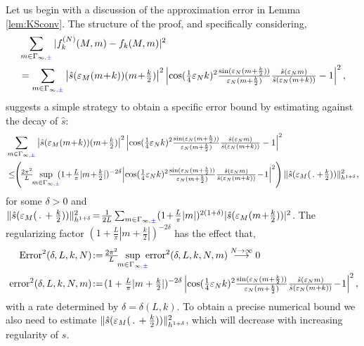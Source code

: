 \documentclass[a4paper, 11pt]{article}
\DeclareMathOperator{\1}{\mathds{1}}
\begin{document}
\bigskip

Let us begin with a discussion of the approximation error in Lemma \ref{lem:KSconv}. The structure of the proof, and specifically considering,
\begin{align}
\label{eq:uniformestimate}
& \sum_{m\in\Gamma_{\infty,{\color{blue}\pm}}}|f^{(N)}_{k}(M,m)-f_{k}(M,m)|^{2} \\ \nonumber
& = \sum_{m\in\Gamma_{\infty,{\color{blue}\pm}}}\left|\hat{s}(\varepsilon_{M}(m\!+\!k))(m\!+\!\tfrac{k}{2})\right|^{2}\left|\cos(\tfrac{1}{4}\varepsilon_{N}k)^{2}\tfrac{\sin(\varepsilon_{N}(m+\frac{k}{2}))}{\varepsilon_{N}(m+\frac{k}{2})}\tfrac{\hat{s}(\varepsilon_{N}m)}{\hat{s}(\varepsilon_{N}(m+k))}-1\right|^{2},
\end{align}
suggests a simple strategy to obtain a specific error bound by estimating against the decay of $\hat{s}$:
\begin{align}
\label{eq:sobolevtrade}
& \sum_{m\in\Gamma_{\infty,{\color{blue}\pm}}}\left|\hat{s}(\vep_{M}(m\!+\!k))(m\!+\!\tfrac{k}{2})\right|^{2}\left| \cos(\tfrac{1}{4}\vep_{N}k)^{2}\tfrac{\sin(\vep_{N}(m+\frac{k}{2}))}{\vep_{N}(m+\frac{k}{2})}\tfrac{\hat{s}(\vep_{N}m)}{\hat{s}(\vep_{N}(m+k))}-1\right|^{2} \\ \nonumber
& \leq\!\!\left(\!\tfrac{2\pi^{2}}{L}\!\!\sup_{m\in\Gamma_{\infty,{\color{blue}\pm}}}\!\!(1\!+\!\tfrac{L}{\pi}|m\!+\!\tfrac{k}{2}|)^{-2\delta}\!\left| \cos(\tfrac{1}{4}\vep_{N}k)^{2}\tfrac{\sin(\vep_{N}(m+\frac{k}{2}))}{\vep_{N}(m+\frac{k}{2})}\tfrac{\hat{s}(\vep_{N}m)}{\hat{s}(\vep_{N}(m+k))}\!-\!1\right|^{2}\right)\|\hat{s}(\vep_{M}(\!\ .\!\ \!+\!\tfrac{k}{2}))\|_{h^{1+\delta}}^{2},
\end{align}
for some $\delta>0$ and $\|\hat{s}(\vep_{M}(\!\ .\!\ +\tfrac{k}{2}))\|_{h^{1+\delta}}^{2}\!=\!\tfrac{1}{2L}\sum_{m\in\Gamma_{\infty,{\color{blue}\pm}}}(1\!+\!\tfrac{L}{\pi}|m|)^{2(1+\delta)}|\hat{s}(\vep_{M}(m\!+\!\tfrac{k}{2}))|^{2}$. The regularizing factor $(1\!+\!\tfrac{L}{\pi}|m\!+\!\tfrac{k}{2}|)^{-2\delta}$ has the effect that,
\begin{align}
\label{eq:errordecay}
\textup{Error}^{2}(\delta,L, k, N) &\!:=\!\tfrac{2\pi^2}{L}\!\!\sup_{m\in\Gamma_{\infty,{\color{blue}\pm}}}\!\!\!\textup{error}^{2}(\delta,L, k, N,m) \stackrel{N\rightarrow\infty}\longrightarrow 0 \\ \nonumber
\textup{error}^{2}(\delta,L, k, N,m) &\!:=\!(1+\tfrac{L}{\pi}|m+\tfrac{k}{2}|)^{-2\delta}\left| \cos(\tfrac{1}{4}\vep_{N}k)^{2}\tfrac{\sin(\vep_{N}(m+\frac{k}{2}))}{\vep_{N}(m+\frac{k}{2})}\tfrac{\hat{s}(\vep_{N}m)}{\hat{s}(\vep_{N}(m+k))}\!-\!1\right|^{2},
\end{align}
with a rate determined by $\delta = \delta(L,k)$. To obtain a precise numerical bound we also need to estimate $\|\hat{s}(\vep_{M}(\!\ .\!\ +\tfrac{k}{2}))\|_{h^{1+\delta}}^{2}$, which will decrease with increasing regularity of $s$.
\end{document}
